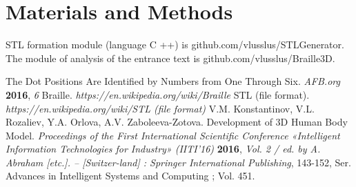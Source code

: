 \documentclass[journal,article,submit,moreauthors,pdftex,10pt,a4paper]{mdpi}
\begin{document}
\section{Materials and Methods}

STL formation module (language C ++) is github.com/vlusslus/STLGenerator. The module of analysis of the entrance text is github.com/vlusslus/Braille3D.


\vspace{6pt} 



\begin{thebibliography}{999}
\bibitem[Author1(2016)]
The Dot Positions Are Identified by Numbers from One Through Six. {\em AFB.org} {\bf 2016}, {\em 6}
\bibitem[Author2(2010)]
Braille. {\em https://en.wikipedia.org/wiki/Braille}
\bibitem[Author3(2010)]
STL (file format). {\em https://en.wikipedia.org/wiki/STL (file format)}
V.M. Konstantinov, V.L. Rozaliev, Y.A. Orlova, A.V. Zaboleeva-Zotova. Development of 3D Human Body Model. {\em Proceedings of the First International Scientific Conference «Intelligent Information Technologies for Industry» (IITI’16)} {\bf 2016}, {\em Vol. 2 / ed. by A. Abraham [etc.]. – [Switzer-land] : Springer International Publishing}, 143-152, Ser. Advances in Intelligent Systems and Computing ; Vol. 451.
\end{thebibliography}


%

\end{document}
